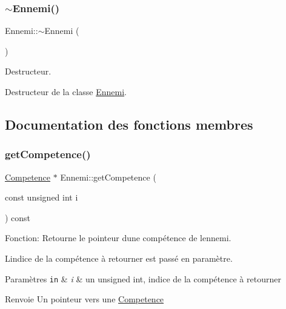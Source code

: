 \subsubsection{\texorpdfstring{$\sim$\+Ennemi()}{~Ennemi()}}
{\footnotesize\ttfamily Ennemi\+::$\sim$\+Ennemi (\begin{DoxyParamCaption}{ }\end{DoxyParamCaption})}



Destructeur. 

Destructeur de la classe \mbox{\hyperlink{classEnnemi}{Ennemi}}. 

\subsection{Documentation des fonctions membres}
\mbox{\label{classEnnemi_a9c7e7595dc73c4f21c0693a54cac4d7f}} 
\subsubsection{\texorpdfstring{get\+Competence()}{getCompetence()}}
{\footnotesize\ttfamily \mbox{\hyperlink{structCompetence}{Competence}} $\ast$ Ennemi\+::get\+Competence (\begin{DoxyParamCaption}\item[{const unsigned int}]{i }\end{DoxyParamCaption}) const}



Fonction\+: Retourne le pointeur d\textquotesingle{}une compétence de l\textquotesingle{}ennemi. 

L\textquotesingle{}indice de la compétence à retourner est passé en paramètre. 
\begin{DoxyParams}[1]{Paramètres}
\mbox{\tt in}  & {\em i} & un unsigned int, indice de la compétence à retourner \\
\hline
\end{DoxyParams}
\begin{DoxyReturn}{Renvoie}
Un pointeur vers une \mbox{\hyperlink{structCompetence}{Competence}} 
\end{DoxyReturn}
\mbox{\label{classEnnemi_a950afe7b7e0bc6b5b9d184b08805f1af}} 
